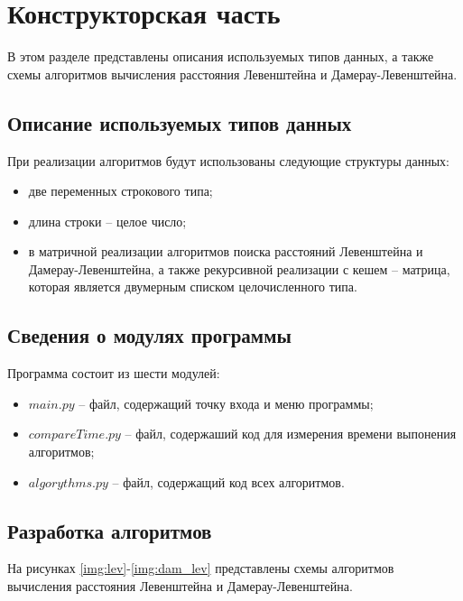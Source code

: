 \chapter{Конструкторская часть}
В этом разделе представлены описания используемых типов данных, а также схемы алгоритмов вычисления расстояния Левенштейна и Дамерау-Левенштейна.

\section{Описание используемых типов данных}
При реализации алгоритмов будут использованы следующие структуры данных:

\begin{itemize}
    \item две переменных строкового типа;
    \item длина строки -- целое число;
    \item в матричной реализации алгоритмов поиска расстояний Левенштейна и Дамерау-Левенштейна, а также рекурсивной реализации с кешем -- матрица, которая является двумерным списком целочисленного типа.
\end{itemize}


\section{Сведения о модулях программы}
Программа состоит из шести модулей:
\begin{itemize}
	\item $main.py$ -- файл, содержащий точку входа и меню программы;
    \item $compareTime.py$ -- файл, содержаший код для измерения времени выпонения алгоритмов;
    \item $algorythms.py$ -- файл, содержащий код всех алгоритмов. \newline
\end{itemize}


\section{Разработка алгоритмов}
На рисунках \ref{img:lev}-\ref{img:dam_lev} представлены схемы алгоритмов вычисления расстояния Левенштейна и Дамерау-Левенштейна.


